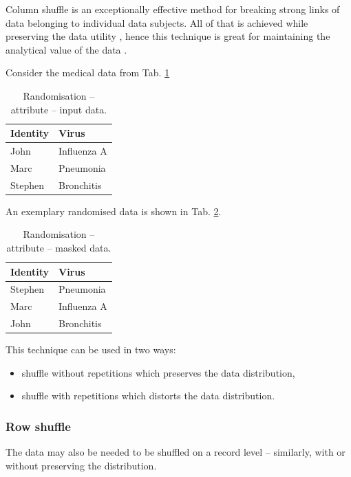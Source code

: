 \documentclass[a4paper,twoside,12pt]{book}
\begin{document}
Column shuffle is an exceptionally effective method for breaking strong links of data belonging to individual data subjects. All of that is achieved while preserving the data utility \cite{bib:gdpr_handbook}, hence this technique is great for maintaining the analytical value of the data \cite{bib:data_shuffling}.

Consider the medical data from Tab. \ref{id:tab:attribute_randomisation_raw}

\begin{table}%
\centering
\caption{Randomisation – attribute -- input data.}
\label{id:tab:attribute_randomisation_raw}
\begin{tabular}{ll}
\toprule
Identity & Virus        \\ \midrule
John     & Influenza A  \\
Marc     & Pneumonia    \\
Stephen  & Bronchitis   \\ \bottomrule
\end{tabular}
\end{table}

An exemplary randomised data is shown in Tab. \ref{id:tab:attribute_randomisation_masked}.

\begin{table}%
\centering
\caption{Randomisation – attribute – masked data.}
\label{id:tab:attribute_randomisation_masked}
\begin{tabular}{ll}
\toprule
Identity & Virus         \\ \midrule
Stephen  & Pneumonia     \\
Marc     &  Influenza A  \\
John     & Bronchitis    \\ \bottomrule
\end{tabular}
\end{table}

This technique can be used in two ways:
\begin{itemize}
\item shuffle without repetitions which preserves the data distribution,
\item shuffle with repetitions which distorts the data distribution.
\end{itemize}

\subsubsection{Row shuffle}

The data may also be needed to be shuffled on a record level – similarly, with or without preserving the distribution.
\end{document}
